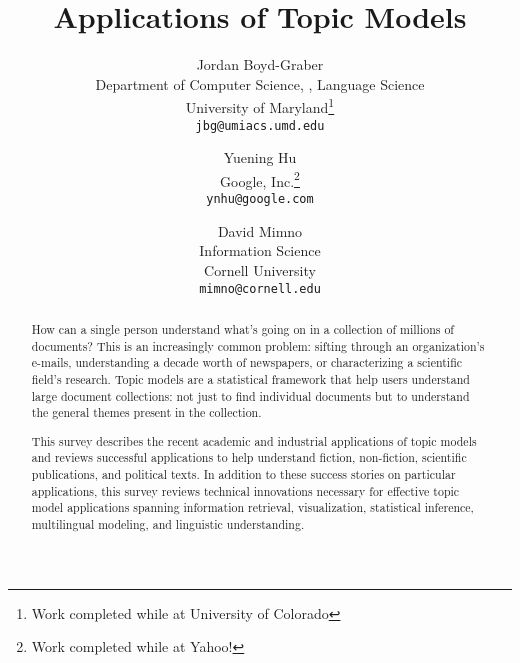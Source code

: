 \documentclass[openany]{now} %
\title{Applications of Topic Models}
\author{
Jordan Boyd-Graber \\
Department of Computer Science, \abr{umiacs}, Language Science \\
University of Maryland\footnote{Work completed while at University of Colorado} \\
\texttt{jbg@umiacs.umd.edu}
\and
Yuening Hu \\
Google, Inc.\footnote{Work completed while at Yahoo!} \\
\texttt{ynhu@google.com}
\and
David Mimno \\
Information Science \\
Cornell University \\
\texttt{mimno@cornell.edu}
}
\begin{document}
\copyrightowner{}

\frontmatter  %

\maketitle

\tableofcontents

\mainmatter

\begin{abstract}
  How can a single person understand what's going on in a collection
  of millions of documents?  This is an increasingly common problem:
  sifting through an organization's e-mails, understanding a decade
  worth of newspapers, or characterizing a scientific field's
  research.  Topic models are a statistical framework that help users
  understand large document collections: not just to find individual
  documents but to understand the general themes
  present in the collection.

  This survey describes the recent academic and industrial
  applications of topic models and reviews successful applications to
  help understand fiction, non-fiction, scientific publications, and
  political texts.  In addition to these success stories on particular
  applications, this survey reviews technical innovations necessary
  for effective topic model applications spanning information
  retrieval, visualization, statistical inference, multilingual
  modeling, and linguistic understanding.
\end{abstract}












\backmatter  %



\end{document}
